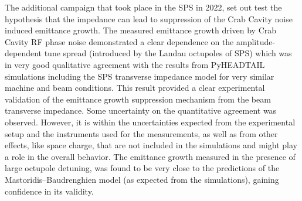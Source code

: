 The additional campaign that took place in the SPS in 2022, set out test the hypothesis that the impedance can lead to suppression of the Crab Cavity noise induced emittance growth. The measured emittance growth driven by Crab Cavity RF phase noise demonstrated a clear dependence on the amplitude-dependent tune spread (introduced by the Landau octupoles of SPS) which was in very good qualitative agreement with the results from PyHEADTAIL simulations including the SPS transverse impedance model for very similar machine and beam conditions. This result provided a clear experimental validation of the emittance growth suppression mechanism from the beam transverse impedance. Some uncertainty on the quantitative agreement was observed. However, it is within the uncertainties expected from the experimental setup and the instruments used for the measurements, as well as from other effects, like space charge, that are not included in the simulations and might play a role in the overall behavior. The emittance growth measured in the presence of large octupole detuning, was found to be very close to the predictions of the Mastoridis--Baudrenghien model (as expected from the simulations), gaining confidence in its validity.




